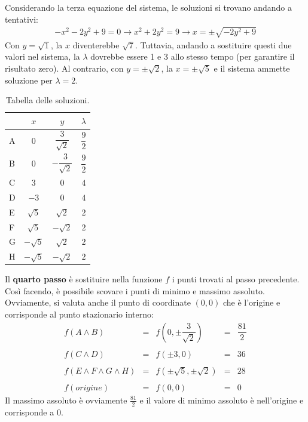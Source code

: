 \documentclass[a4paper]{article}
\begin{document}
	Considerando la terza equazione del sistema, le soluzioni si trovano andando a tentativi:
	\begin{gather*}
		-x^{2} - 2y^{2} + 9 = 0 \longrightarrow x^{2} + 2y^{2} = 9 \longrightarrow x = \pm \sqrt{-2y^{2} + 9}
	\end{gather*}
	Con $y = \sqrt{1}$, la $x$ diventerebbe $\sqrt{7}$. Tuttavia, andando a sostituire questi due valori nel sistema, la $\lambda$ dovrebbe essere 1 e 3 allo stesso tempo (per garantire il risultato zero). Al contrario, con $y = \pm \sqrt{2}$, la $x = \pm \sqrt{5}$ e il sistema ammette soluzione per $\lambda = 2$.
	\begin{table}[!htp]
		\centering
		\begin{tabular}{@{} l | c | c | c @{}}
			\toprule
			& $x$ & $y$ & $\lambda$ \\
			\midrule
			A & $0$ & $\dfrac{3}{\sqrt{2}}$ & $\dfrac{9}{2}$ \\ [1em]
			B & $0$ & $-\dfrac{3}{\sqrt{2}}$ & $\dfrac{9}{2}$ \\ 
			\cmidrule{1-4}
			C & $3$ & $0$ & $4$ \\ [1em]
			D & $-3$ & $0$ & $4$ \\ [1em]
			E & $\sqrt{5}$ 	& $\sqrt{2}$ 	& $2$ \\ [1em]
			F & $\sqrt{5}$ & $-\sqrt{2}$ 	& $2$ \\ [1em]
			G & $-\sqrt{5}$ & $\sqrt{2}$ 	& $2$ \\ [1em]
			H & $-\sqrt{5}$ & $-\sqrt{2}$ 	& $2$ \\ 
			\bottomrule
		\end{tabular}
		\caption*{Tabella delle soluzioni.}
	\end{table}\newpage

	\noindent
	Il \textbf{quarto passo} è sostituire nella funzione $f$ i punti trovati al passo precedente. Così facendo, è possibile scovare i punti di minimo e massimo assoluto. Ovviamente, si valuta anche il punto di coordinate $\left(0,0\right)$ che è l'origine e corrisponde al punto stazionario interno:
	\begin{equation*}
		\begin{array}{rclcl}
			f\left(A \land B\right) &=& f\left(0, \pm \dfrac{3}{\sqrt{2}}\right) &=& \dfrac{81}{2} \\
			\\
			f\left(C \land D\right) &=& f\left(\pm 3, 0\right) &=& 36 \\
			\\
			f\left(E \land F \land G \land H\right) &=& f\left(\pm \sqrt{5}, \pm\sqrt{2}\right) &=& 28 \\
			\\
			f\left(origine\right) &=& f\left(0,0\right) &=& 0 
		\end{array}
	\end{equation*}
	Il massimo assoluto è ovviamente $\frac{81}{2}$ e il valore di minimo assoluto è nell'origine e corrisponde a $0$.\newpage
\end{document}
